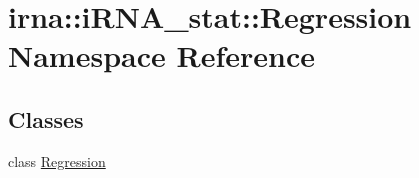 \hypertarget{namespaceirna_1_1iRNA__stat_1_1Regression}{
\section{irna\-:\-:i\-R\-N\-A\-\_\-stat\-:\-:\-Regression \-Namespace \-Reference}
\label{namespaceirna_1_1iRNA__stat_1_1Regression}
}
\subsection*{\-Classes}
\begin{DoxyCompactItemize}
\item 
class \hyperlink{classirna_1_1iRNA__stat_1_1Regression_1_1Regression}{\-Regression}
\end{DoxyCompactItemize}
